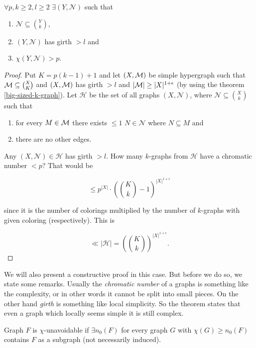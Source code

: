 \begin{cor}
	$\forall p, k \geq 2, l \geq 2$ $\exists (Y, \mathcal{N})$ such that
	
	\begin{enumerate}
		\item $\mathcal{N} \subseteq \binom{Y}{k}$,
		\item $(Y, \mathcal{N})$ has girth $> l$ and
		\item $\chi(Y, \mathcal{N}) > p$.
	\end{enumerate}
	\label{chromatic-girth}
\end{cor}

\begin{proof}
	Put $K = p (k-1) + 1$ and let $(X, \mathcal{M})$ be simple hypergraph such that $\mathcal{M} \subseteq \binom{X}{K}$ and $(X, \mathcal{M})$ has girth $> l$ and $|\mathcal{M}| \geq |X|^{1+\epsilon}$ (by using the theorem \ref{big-sized-k-graph}). Let $\mathcal{H}$ be the set of all graphs $(X, \mathcal{N})$, where $\mathcal{N} \subseteq \binom{X}{k}$ such that
	
	\begin{enumerate}
		\item for every $M \in \mathcal{M}$ there exists $\leq 1$ $N \in \mathcal{N}$ where $N \subseteq M$ and
		\item there are no other edges.
	\end{enumerate}
	
	\noindent Any $(X, \mathcal{N}) \in \mathcal{H}$ has girth $> l$. How many $k$-graphs from $\mathcal{H}$ have a chromatic number $< p$? That would be
	
	$$
	\leq p^{|X|} \cdot \left(\binom{K}{k} - 1\right)^{|X|^{1 + \epsilon}}
	$$
	
	\noindent since it is the number of colorings multiplied by the number of $k$-graphs with given coloring (respectively). This is
	
	$$
	\ll |\mathcal{H}| = \left(\binom{K}{k}\right)^{|X|^{1 + \epsilon}}.
	$$
\end{proof}

We will also present a constructive proof in this case. But before we do so, we state some remarks. Usually the \textit{chromatic number} of a graphs is something like the complexity, or in other words it cannot be split into small pieces. On the other hand \textit{girth} is something like local simplicity. So the theorem states that even a graph which locally seems simple it is still complex.

\begin{defn}
	Graph $F$ is $\chi$-unavoidable if $\exists n_0(F)$ for every graph $G$ with $\chi(G) \geq n_0(F)$ contains $F$ as a subgraph (not necessarily induced).
\end{defn}

